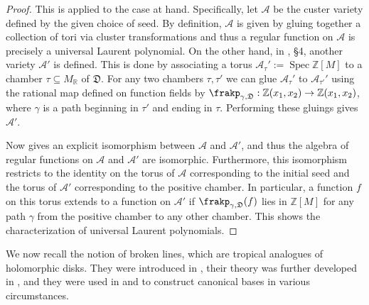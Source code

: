 \documentclass[11pt]{amsart}
\newcommand{\sayMC}[1]{\say[MC]{#1}}
\theoremstyle{remark}
\numberwithin{equation}{section}
\newcommand{\RR}{\mathbb{R}}
\newcommand{\ZZ}{\mathbb{Z}}
\newcommand{\cA}{\mathcal{A}}
\newcommand{\fD}{\mathfrak{D}}
\newcommand{\Spec}{\operatorname{Spec}}
\begin{document}
\begin{proof}
  This is \cite[Theorem 4.4]{GHKK} applied to the case at hand.
  Specifically, let $\cA$ be the custer variety defined by the given choice of
  seed. By definition, $\cA$ is given by gluing together a collection of tori
  via cluster transformations and thus a regular function on $\cA$ is precisely a
  universal Laurent polynomial.  On the other hand, in
  \cite{GHKK}, \S 4, another variety $\cA'$ is defined. This is done by
  associating a torus $\cA_{\tau}':= \Spec \ZZ[M]$ to a chamber $\tau\subseteq
  M_{\RR}$ \sayMC{ check if still $\RR$} of $\fD$. For any two chambers $\tau,\tau'$ we can glue $\cA_{\tau}'$
  to $\cA_{\tau'}'$ using the rational map defined on function fields by
  $\frakp_{\gamma,\fD}:\ZZ(x_1,x_2)\rightarrow \ZZ(x_1,x_2)$, where $\gamma$
  is a path beginning in $\tau'$ and ending in $\tau$. Performing these gluings
  gives $\cA'$.

  Now \cite[Theorem 4.4]{GHKK} gives an explicit isomorphism between $\cA$ and
  $\cA'$, and thus the algebra of regular functions on $\cA$ and $\cA'$ are
  isomorphic. Furthermore, this isomorphism restricts to the identity on the
  torus of $\cA$ corresponding to the initial seed and the torus of $\cA'$
  corresponding to the positive chamber. In particular, a function $f$ on this
  torus extends to a function on $\cA'$ if $\frakp_{\gamma,\fD}(f)$ lies in
  $\ZZ[M]$ for any path $\gamma$ from the positive chamber to any other
  chamber. This shows the characterization of universal Laurent polynomials.
\end{proof}

We now recall the notion of broken lines, which are tropical analogues of holomorphic disks.  They were introduced in \cite{G10}, their theory was further developed in \cite{CPS}, and they were
used in \cite{GHK11} and \cite{GHKK} to construct canonical bases in various
circumstances.
\end{document}
